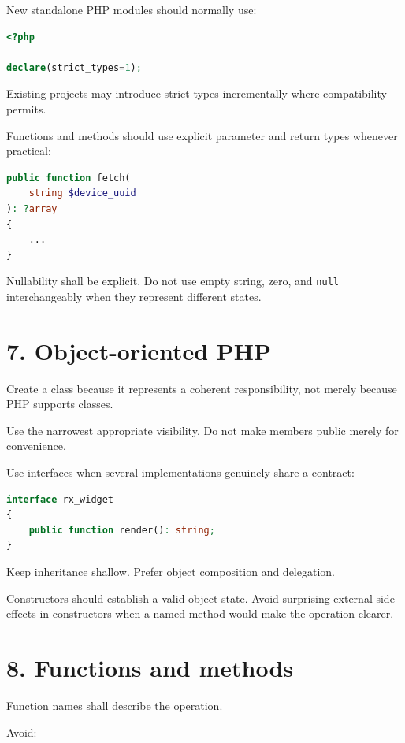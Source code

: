 \documentclass[11pt,a4paper]{article}
\begin{document}
New standalone PHP modules should normally use:

\begin{lstlisting}[language=PHP]
<?php

declare(strict_types=1);
\end{lstlisting}

Existing projects may introduce strict types incrementally where
compatibility permits.

Functions and methods should use explicit parameter and return types
whenever practical:

\begin{lstlisting}[language=PHP]
public function fetch(
    string $device_uuid
): ?array
{
    ...
}
\end{lstlisting}

Nullability shall be explicit. Do not use empty string, zero, and
\passthrough{\lstinline!null!} interchangeably when they represent
different states.

\section{7. Object-oriented PHP}\label{7-object-oriented-php}

Create a class because it represents a coherent responsibility, not
merely because PHP supports classes.

Use the narrowest appropriate visibility. Do not make members public
merely for convenience.

Use interfaces when several implementations genuinely share a contract:

\begin{lstlisting}[language=PHP]
interface rx_widget
{
    public function render(): string;
}
\end{lstlisting}

Keep inheritance shallow. Prefer object composition and delegation.

Constructors should establish a valid object state. Avoid surprising
external side effects in constructors when a named method would make the
operation clearer.

\section{8. Functions and methods}\label{8-functions-and-methods}

Function names shall describe the operation.

Avoid:
\end{document}
